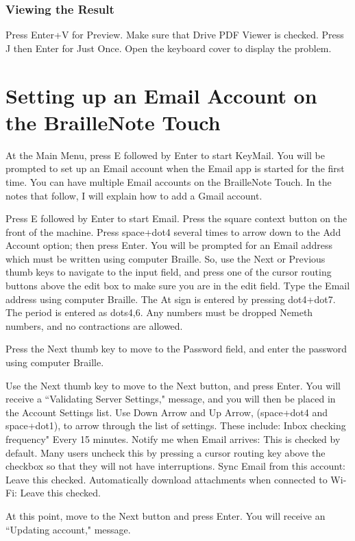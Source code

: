 \documentclass[10pt,letterpaper,twoside]{report}
\begin{document}
{{{\subsubsection{Viewing the Result}

Press Enter+V for Preview.
Make sure that Drive PDF Viewer is checked.
Press J then Enter for Just Once.
Open the keyboard cover to display the problem.

\section{Setting up an Email Account on the BrailleNote Touch}

At the Main Menu, press E followed by Enter to start KeyMail. You will be prompted to set up an Email account when the Email app is started for the first time. You can have multiple Email accounts on the BrailleNote Touch. In the notes that follow, I will explain how to add a Gmail account.

Press E followed by Enter to start Email.
Press the square context button on the front of the machine.
Press space+dot4 several times to arrow down to the Add Account option; then press Enter.
You will be prompted for an Email address which must be written using computer Braille. So, use the Next or Previous thumb keys to navigate to the input field, and press one of the cursor routing buttons above the edit box to make sure you are in the edit field. Type the Email address using computer Braille. The At sign is entered by pressing dot4+dot7. The period is entered as dots4,6. Any numbers must be dropped Nemeth numbers, and no contractions are allowed.

Press the Next thumb key to move to the Password field, and enter the password using computer Braille.

Use the Next thumb key to move to the Next button, and press Enter. You will receive a ``Validating Server Settings," message, and you will then be placed in the Account Settings list.
Use Down Arrow and Up Arrow, (space+dot4 and space+dot1), to arrow through the list of settings. These include:
Inbox checking frequency" Every 15 minutes.
Notify me when Email arrives: This is checked by default. Many users uncheck this by pressing a cursor routing key above the checkbox so that they will not have interruptions.
Sync Email from this account: Leave this checked.
Automatically download attachments when connected to Wi-Fi: Leave this checked.

At this point, move to the Next button and press Enter. You will receive an ``Updating account," message.

}}}
\end{document}
